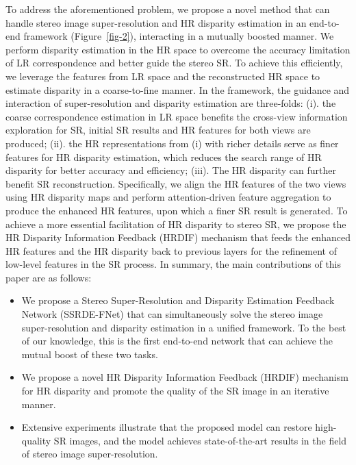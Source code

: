 \documentclass[sigconf]{acmart}
\begin{document}
To address the aforementioned problem, we propose a novel method that can handle stereo image super-resolution and HR disparity estimation in an end-to-end framework (Figure~\ref{fig-2}), interacting in a mutually boosted manner. We perform disparity estimation in the HR space to overcome the accuracy limitation of LR correspondence and better guide the stereo SR. To achieve this efficiently, we leverage the features from LR space and the reconstructed HR space to estimate disparity in a coarse-to-fine manner. In the framework, the guidance and interaction of super-resolution and disparity estimation are three-folds: (i). the coarse correspondence estimation in LR space benefits the cross-view information exploration for SR, initial SR results and HR features for both views are produced; (ii). the HR representations from (i) with richer details serve as finer features for HR disparity estimation, which reduces the search range of HR disparity for better accuracy and efficiency; (iii). The HR disparity can further benefit SR reconstruction. Specifically, we align the HR features of the two views using HR disparity maps and perform attention-driven feature aggregation to produce the enhanced HR features, upon which a finer SR result is generated. To achieve a more essential facilitation of HR disparity to stereo SR, we propose the HR Disparity Information Feedback (HRDIF) mechanism that feeds the enhanced HR features and the HR disparity back to previous layers for the refinement of low-level features in the SR process. In summary, the main contributions of this paper are as follows:

\begin{itemize}
	\item We propose a Stereo Super-Resolution and Disparity Estimation Feedback Network (SSRDE-FNet) that can simultaneously solve the stereo image super-resolution and disparity estimation in a unified framework. To the best of our knowledge, this is the first end-to-end network that can achieve the mutual boost of these two tasks.
	
	\item We propose a novel HR Disparity Information Feedback (HRDIF) mechanism for HR disparity and promote the quality of the SR image in an iterative manner.
	
	\item Extensive experiments illustrate that the proposed model can restore high-quality SR images, and the model achieves state-of-the-art results in the field of stereo image super-resolution.
\end{itemize}
\end{document}
